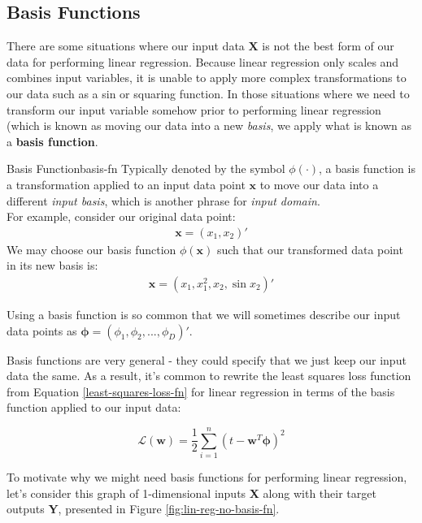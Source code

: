 \subsection{Basis Functions}
There are some situations where our input data $\textbf{X}$ is not the best form of our data for performing linear regression. Because linear regression only scales and combines input variables, it is unable to apply more complex transformations to our data such as a sin or squaring function. In those situations where we need to transform our input variable somehow prior to performing linear regression (which is known as moving our data into a new \textit{basis}, we apply what is known as a \textbf{basis function}.

\begin{definition}{Basis Function}{basis-fn}
    Typically denoted by the symbol $\phi(\cdot)$, a basis function is a transformation applied to an input data point $\textbf{x}$ to move our data into a different \textit{input basis}, which is another phrase for \textit{input domain}. \\

    For example, consider our original data point:
    \begin{align*}
        \textbf{x} = (x_{1}, x_{2})'
    \end{align*}
    We may choose our basis function $\phi(\textbf{x})$ such that our transformed data point in its new basis is:
    \begin{align*}
        \textbf{x} = (x_{1}, x_{1}^2, x_{2}, \sin{x_{2}})'
    \end{align*}

    Using a basis function is so common that we will sometimes describe our input data points as $\boldsymbol{\phi} = (\phi_{1}, \phi_{2}, ..., \phi_{D})'$.
\end{definition}

Basis functions are very general - they could specify that we just keep our input data the same. As a result, it's common to rewrite the least squares loss function from Equation \ref{least-squares-loss-fn} for linear regression in terms of the basis function applied to our input data:

\begin{equation} \label{least-squares-loss-fn-w-basis}
    \mathcal{L}(\textbf{w}) = \frac{1}{2} \sum_{i=1}^{n} (t - \textbf{w}^{T}\boldsymbol{\phi})^2
\end{equation}

To motivate why we might need basis functions for performing linear regression, let's consider this graph of 1-dimensional inputs \textbf{X} along with their target outputs \textbf{Y}, presented in Figure \ref{fig:lin-reg-no-basis-fn}.

